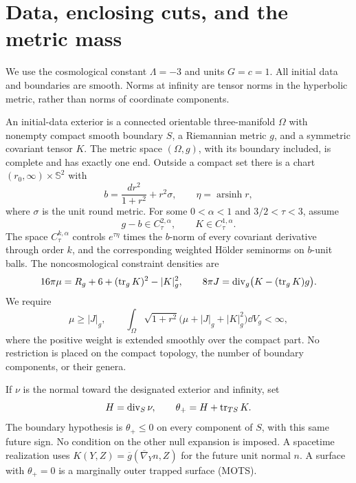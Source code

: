 \section{Data, enclosing cuts, and the metric mass}\label{sec:setup}

We use the cosmological constant $\Lambda=-3$ and units $G=c=1$.
All initial data and boundaries are smooth. Norms at infinity are tensor
norms in the hyperbolic metric, rather than norms of coordinate components.

\begin{definition}\label{def:setup-data}
An initial-data exterior is a connected orientable three-manifold
$\Omega$ with nonempty compact smooth boundary $S$, a Riemannian metric
$g$, and a symmetric covariant tensor $K$. The metric space
$(\Omega,g)$, with its boundary included, is complete and has exactly one end.
Outside a compact set there is a chart $(r_0,\infty)\times\mathbb S^2$ with
\begin{equation}\label{eq:setup-background}
 b=\frac{dr^2}{1+r^2}+r^2\sigma,
 \qquad \eta=\operatorname{arsinh}r,
\end{equation}
where $\sigma$ is the unit round metric. For some $0<\alpha<1$ and
$3/2<\tau<3$, assume
\begin{equation}\label{eq:setup-decay}
 g-b\in C^{2,\alpha}_\tau,
 \qquad K\in C^{1,\alpha}_\tau.
\end{equation}
The space $C^{k,\alpha}_\tau$ controls $e^{\tau\eta}$ times the
$b$-norm of every covariant derivative through order $k$, and the
corresponding weighted H\"older seminorms on $b$-unit balls.
The noncosmological constraint densities are
\begin{equation}\label{eq:setup-constraints}
 16\pi\mu=R_g+6+(\operatorname{tr}_gK)^2-\lvert K\rvert_g^2,
 \qquad 8\pi J=\operatorname{div}_g\bigl(K-(\operatorname{tr}_gK)g\bigr).
\end{equation}
We require
\begin{equation}\label{eq:setup-dec}
 \mu\ge\lvert J\rvert_g,
 \qquad
 \int_\Omega\sqrt{1+r^2}
       \bigl(\mu+\lvert J\rvert_g+\lvert K\rvert_g^2\bigr)
       \dd V_g<\infty,
\end{equation}
where the positive weight is extended smoothly over the compact part.
No restriction is placed on the compact topology, the number of boundary
components, or their genera.
\end{definition}

If $\nu$ is the normal toward the designated exterior and infinity, set
\begin{equation}\label{eq:setup-expansion}
 H=\operatorname{div}_{S}\nu,
 \qquad \theta_+=H+\operatorname{tr}_{TS}K.
\end{equation}
The boundary hypothesis is $\theta_+\le0$ on every component of $S$,
with this same future sign. No condition on the other null expansion is
imposed. A spacetime realization uses
$K(Y,Z)=\overline g(\overline\nabla_Y n,Z)$ for the future unit normal $n$.
A surface with $\theta_+=0$ is a marginally outer trapped surface (MOTS).

